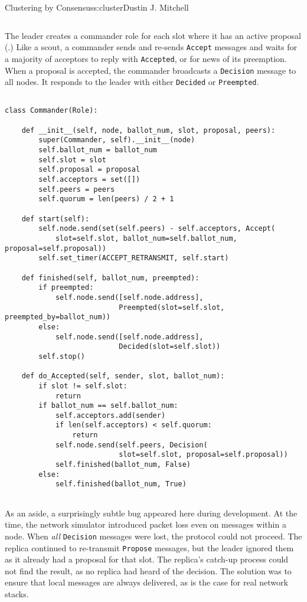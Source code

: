 \begin{aosachapter}{Clustering by Consensus}{s:cluster}{Dustin J. Mitchell}
\begin{verbatim}
\end{verbatim}

The leader creates a commander role for each slot where it has an active
proposal (.) Like a scout, a
commander sends and re-sends \texttt{Accept} messages and waits for a
majority of acceptors to reply with \texttt{Accepted}, or for news of
its preemption. When a proposal is accepted, the commander broadcasts a
\texttt{Decision} message to all nodes. It responds to the leader with
either \texttt{Decided} or \texttt{Preempted}.


\begin{verbatim}

class Commander(Role):

    def __init__(self, node, ballot_num, slot, proposal, peers):
        super(Commander, self).__init__(node)
        self.ballot_num = ballot_num
        self.slot = slot
        self.proposal = proposal
        self.acceptors = set([])
        self.peers = peers
        self.quorum = len(peers) / 2 + 1

    def start(self):
        self.node.send(set(self.peers) - self.acceptors, Accept(
            slot=self.slot, ballot_num=self.ballot_num, proposal=self.proposal))
        self.set_timer(ACCEPT_RETRANSMIT, self.start)

    def finished(self, ballot_num, preempted):
        if preempted:
            self.node.send([self.node.address], 
                           Preempted(slot=self.slot, preempted_by=ballot_num))
        else:
            self.node.send([self.node.address], 
                           Decided(slot=self.slot))
        self.stop()

    def do_Accepted(self, sender, slot, ballot_num):
        if slot != self.slot:
            return
        if ballot_num == self.ballot_num:
            self.acceptors.add(sender)
            if len(self.acceptors) < self.quorum:
                return
            self.node.send(self.peers, Decision(
                           slot=self.slot, proposal=self.proposal))
            self.finished(ballot_num, False)
        else:
            self.finished(ballot_num, True)
    
\end{verbatim}

As an aside, a surprisingly subtle bug appeared here during development.
At the time, the network simulator introduced packet loss even on
messages within a node. When \emph{all} \texttt{Decision} messages were
lost, the protocol could not proceed. The replica continued to
re-transmit \texttt{Propose} messages, but the leader ignored them as it
already had a proposal for that slot. The replica's catch-up process
could not find the result, as no replica had heard of the decision. The
solution was to ensure that local messages are always delivered, as is
the case for real network stacks.


\end{aosachapter}
